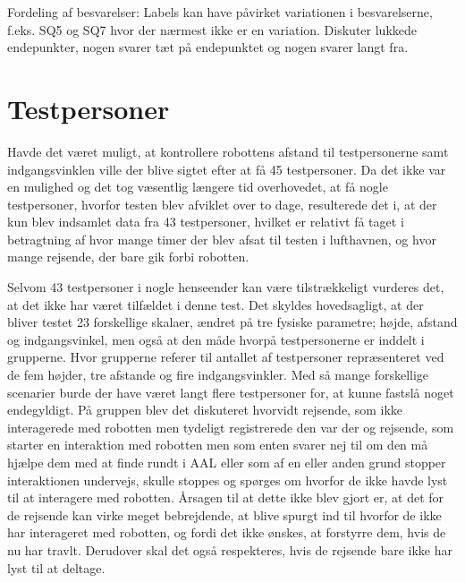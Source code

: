 Fordeling af besvarelser: Labels kan have påvirket variationen i besvarelserne, f.eks. SQ5 og SQ7 hvor der nærmest ikke er en variation. Diskuter lukkede endepunkter, nogen svarer tæt på endepunktet og nogen svarer langt fra. 



\section{Testpersoner}
\label{DiskussionTestpersoner}
%
Havde det været muligt, at kontrollere robottens afstand til testpersonerne samt indgangsvinklen ville der blive sigtet efter at få 45 testpersoner. Da det ikke var en mulighed og det tog væsentlig længere tid overhovedet, at få nogle testpersoner, hvorfor testen blev afviklet over to dage, resulterede det i, at der kun blev indsamlet data fra 43 testpersoner, hvilket er relativt få taget i betragtning af hvor mange timer der blev afsat til testen i lufthavnen, og hvor mange rejsende, der bare gik forbi robotten.

Selvom 43 testpersoner i nogle henseender kan være tilstrækkeligt vurderes det, at det ikke har været tilfældet i denne test. Det skyldes hovedsagligt, at der bliver testet 23 forskellige skalaer, ændret på tre fysiske parametre; højde, afstand og indgangsvinkel, men også at den måde hvorpå testpersonerne er inddelt i grupperne. Hvor grupperne referer til antallet af testpersoner repræsenteret ved de fem højder, tre afstande og fire indgangsvinkler. Med så mange forskellige scenarier burde der have været langt flere testpersoner for, at kunne fastslå noget endegyldigt.\blankline
%
På gruppen blev det diskuteret hvorvidt rejsende, som ikke interagerede med robotten men tydeligt registrerede den var der og rejsende, som starter en interaktion med robotten men som enten svarer nej til om den må hjælpe dem med at finde rundt i AAL eller som af en eller anden grund stopper interaktionen undervejs, skulle stoppes og spørges om hvorfor de ikke havde lyst til at interagere med robotten. Årsagen til at dette ikke blev gjort er, at det for de rejsende kan virke meget bebrejdende, at blive spurgt ind til hvorfor de ikke har interageret med robotten, og fordi det ikke ønskes, at forstyrre dem, hvis de nu har travlt. Derudover skal det også respekteres, hvis de rejsende bare ikke har lyst til at deltage. 

